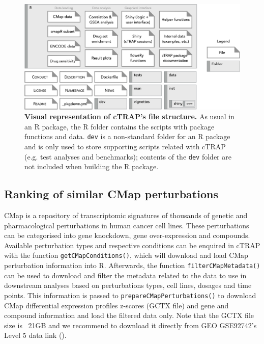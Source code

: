 \begin{figure}[!h]
  \includegraphics[width=1\textwidth]{images/ctrap/file-structure}
  \centering
  \caption[cTRAP file structure]{\textbf{Visual representation of cTRAP's file structure.} As usual in an R package, the R folder contains the scripts with package functions and data. \texttt{dev} is a non-standard folder for an R package and is only used to store supporting scripts related with cTRAP (e.g. test analyses and benchmarks); contents of the \texttt{dev} folder are not included when building the R package.}
  \label{fig:ctrap-file-structure}
\end{figure}

\subsection{Ranking of similar CMap perturbations}

CMap is a repository of transcriptomic signatures of thousands of genetic and pharmacological perturbations in human cancer cell lines. These perturbations can be categorised into gene knockdown, gene over-expression and compounds. Available perturbation types and respective conditions can be enquired in cTRAP with the function \texttt{getCMapConditions()}, which will download and load CMap perturbation information into R. Afterwards, the function \texttt{filterCMapMetadata()} can be used to download and filter the metadata related to the data to use in downstream analyses based on perturbations types, cell lines, dosages and time points. This information is passed to \texttt{prepareCMapPerturbations()} to download CMap differential expression profiles z-scores (GCTX file) and gene and compound information and load the filtered data only. Note that the GCTX file size is ~21GB and we recommend to download it directly from GEO GSE92742’s Level 5 data link ().

